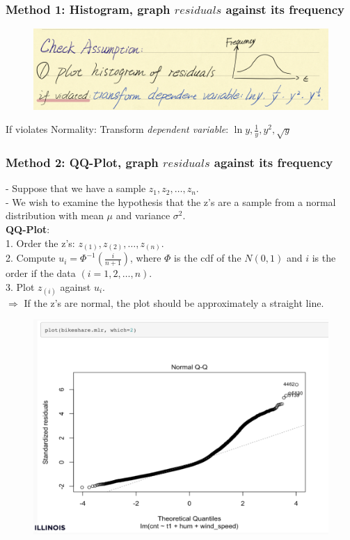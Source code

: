 \documentclass[11pt,a4paper]{article}
\begin{document}
\subsubsection{Method 1: Histogram, graph $residuals$ against its frequency}
\begin{center}\begin{figure}[htbp]
    \centering
    \includegraphics[scale=0.7]{check2.png}
    \caption{}
    \label{}
\end{figure}\end{center}
If violates Normality: Transform \textit{dependent variable}: $\ln{y}, \frac{1}{y},y^2,\sqrt{y}$




\subsubsection{Method 2: QQ-Plot, graph $residuals$ against its frequency}
- Suppose that we have a sample $z_{1}, z_{2}, \ldots, z_{n}$.\\
- We wish to examine the hypothesis that the z's are a sample from a normal distribution with mean $\mu$ and variance $\sigma^{2}$.\\
\textbf{QQ-Plot}:\\
1. Order the z's: $z_{(1)}, z_{(2)}, \ldots, z_{(n)}$.\\
2. Compute $u_{i}=\Phi^{-1}\left(\frac{i}{n+1}\right)$, where $\Phi$ is the cdf of the $N(0,1)$ and $i$ is the order if the data $(i=1,2, \ldots, n)$.\\
3. Plot $z_{(i)}$ against $u_{i}$.\\
$\Rightarrow$ If the z's are normal, the plot should be approximately a straight line.
\begin{center}\begin{figure}[htbp]
    \centering
    \includegraphics[scale=0.7]{check7.png}
    \caption{}
    \label{}
\end{figure}\end{center}
\end{document}
